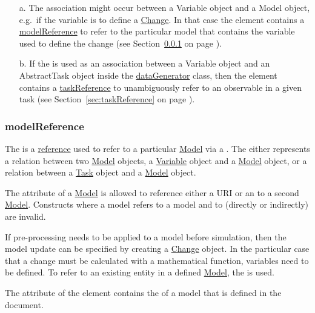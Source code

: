 \begin{enumerate}
\item[a.]{The  association might occur between a Variable object and a Model object, e.g.\ if the variable is to define a \hyperref[class:change]{Change}. 
In that case the  element contains a \hyperref[sec:modelReference]{modelReference} to refer to the particular model that contains the variable used to define the change (see Section~\ref{sec:modelReference} on page \pageref{sec:modelReference}). }
\item[b.]{If the  is used as an association between a Variable object and an AbstractTask object inside the \hyperref[class:dataGenerator]{dataGenerator} class, then the  element contains a \hyperref[sec:taskReference]{taskReference} to unambiguously refer to an observable in a given task (see Section~\ref{sec:taskReference} on page \pageref{sec:taskReference}).}
\end{enumerate}


\subsubsection{modelReference}
\label{sec:modelReference}
The  is a \hyperref[sec:reference]{reference} used to refer to a particular \hyperref[class:model]{Model} via a \hyperref[type:sidref]{}. The  either represents a relation between two \hyperref[class:model]{Model} objects, a \hyperref[class:variable]{Variable} object and a \hyperref[class:model]{Model} object, or a relation between a \hyperref[class:task]{Task} object and a \hyperref[class:model]{Model} object.

The  attribute of a \hyperref[class:model]{Model} is allowed to reference either a URI or an  to a second \hyperref[class:model]{Model}. Constructs where a model  refers to a model  and  to  (directly or indirectly) are invalid.

If pre-processing needs to be applied to a model before simulation, then the model update can be specified by creating a \hyperref[class:change]{Change} object. In the particular case that a change must be calculated with a mathematical function, variables need to be defined. To refer to an existing entity in a defined \hyperref[class:model]{Model}, the  is used. 

The  attribute of the  element contains the  of a model that is defined in the document. 

